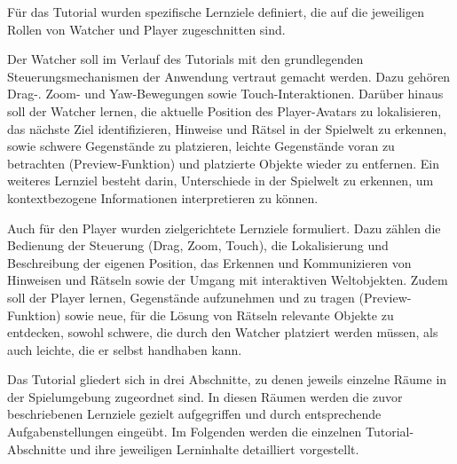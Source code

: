 Für das Tutorial wurden spezifische Lernziele definiert, die auf die jeweiligen Rollen von Watcher und Player zugeschnitten sind.

Der Watcher soll im Verlauf des Tutorials mit den grundlegenden Steuerungsmechanismen der Anwendung vertraut gemacht werden. Dazu gehören Drag-. Zoom- und Yaw-Bewegungen sowie Touch-Interaktionen. Darüber hinaus soll der Watcher lernen, die aktuelle Position des Player-Avatars zu lokalisieren, das nächste Ziel identifizieren, Hinweise und Rätsel in der Spielwelt zu erkennen, sowie schwere Gegenstände zu platzieren, leichte Gegenstände voran zu betrachten (Preview-Funktion) und platzierte Objekte wieder zu entfernen. Ein weiteres Lernziel besteht darin, Unterschiede in der Spielwelt zu erkennen, um kontextbezogene Informationen interpretieren zu können.

Auch für den Player wurden zielgerichtete Lernziele formuliert. Dazu zählen die Bedienung der Steuerung (Drag, Zoom, Touch), die Lokalisierung und Beschreibung der eigenen Position, das Erkennen und Kommunizieren von Hinweisen und Rätseln sowie der Umgang mit interaktiven Weltobjekten. Zudem soll der Player lernen, Gegenstände aufzunehmen und zu tragen (Preview-Funktion) sowie neue, für die Lösung von Rätseln relevante Objekte zu entdecken, sowohl schwere, die durch den Watcher platziert werden müssen, als auch leichte, die er selbst handhaben kann.

Das Tutorial gliedert sich in drei Abschnitte, zu denen jeweils einzelne Räume in der Spielumgebung zugeordnet sind. In diesen Räumen werden die zuvor beschriebenen Lernziele gezielt aufgegriffen und durch entsprechende Aufgabenstellungen eingeübt. Im Folgenden werden die einzelnen Tutorial-Abschnitte und ihre jeweiligen Lerninhalte detailliert vorgestellt.


